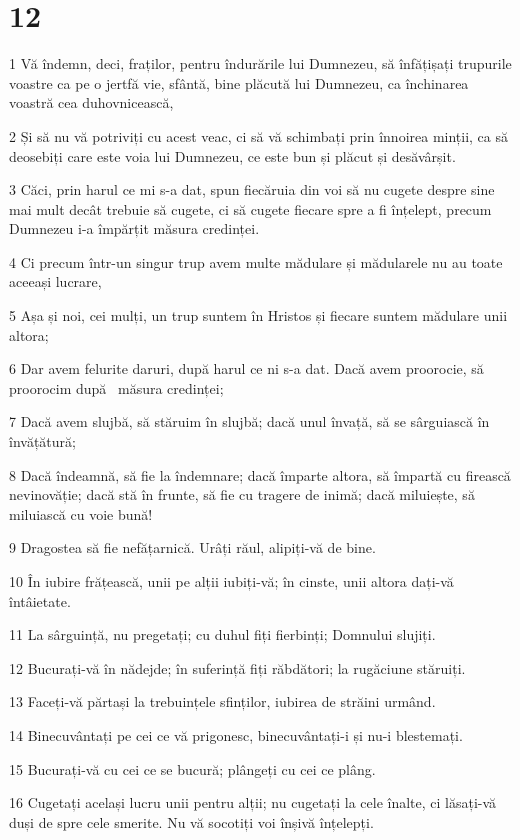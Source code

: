 \chapter{12}

\par 1 Vă îndemn, deci, fraților, pentru îndurările lui Dumnezeu, să înfățișați trupurile voastre ca pe o jertfă vie, sfântă, bine plăcută lui Dumnezeu, ca închinarea voastră cea duhovnicească,
\par 2 Și să nu vă potriviți cu acest veac, ci să vă schimbați prin înnoirea minții, ca să deosebiți care este voia lui Dumnezeu, ce este bun și plăcut și desăvârșit.
\par 3 Căci, prin harul ce mi s-a dat, spun fiecăruia din voi să nu cugete despre sine mai mult decât trebuie să cugete, ci să cugete fiecare spre a fi înțelept, precum Dumnezeu i-a împărțit măsura credinței.
\par 4 Ci precum într-un singur trup avem multe mădulare și mădularele nu au toate aceeași lucrare,
\par 5 Așa și noi, cei mulți, un trup suntem în Hristos și fiecare suntem mădulare unii altora;
\par 6 Dar avem felurite daruri, după harul ce ni s-a dat. Dacă avem proorocie, să proorocim după  măsura credinței;
\par 7 Dacă avem slujbă, să stăruim în slujbă; dacă unul învață, să se sârguiască în învățătură;
\par 8 Dacă îndeamnă, să fie la îndemnare; dacă împarte altora, să împartă cu firească nevinovăție; dacă stă în frunte, să fie cu tragere de inimă; dacă miluiește, să miluiască cu voie bună!
\par 9 Dragostea să fie nefățarnică. Urâți răul, alipiți-vă de bine.
\par 10 În iubire frățească, unii pe alții iubiți-vă; în cinste, unii altora dați-vă întâietate.
\par 11 La sârguință, nu pregetați; cu duhul fiți fierbinți; Domnului slujiți.
\par 12 Bucurați-vă în nădejde; în suferință fiți răbdători; la rugăciune stăruiți.
\par 13 Faceți-vă părtași la trebuințele sfinților, iubirea de străini urmând.
\par 14 Binecuvântați pe cei ce vă prigonesc, binecuvântați-i și nu-i blestemați.
\par 15 Bucurați-vă cu cei ce se bucură; plângeți cu cei ce plâng.
\par 16 Cugetați același lucru unii pentru alții; nu cugetați la cele înalte, ci lăsați-vă duși de spre cele smerite. Nu vă socotiți voi înșivă înțelepți.
